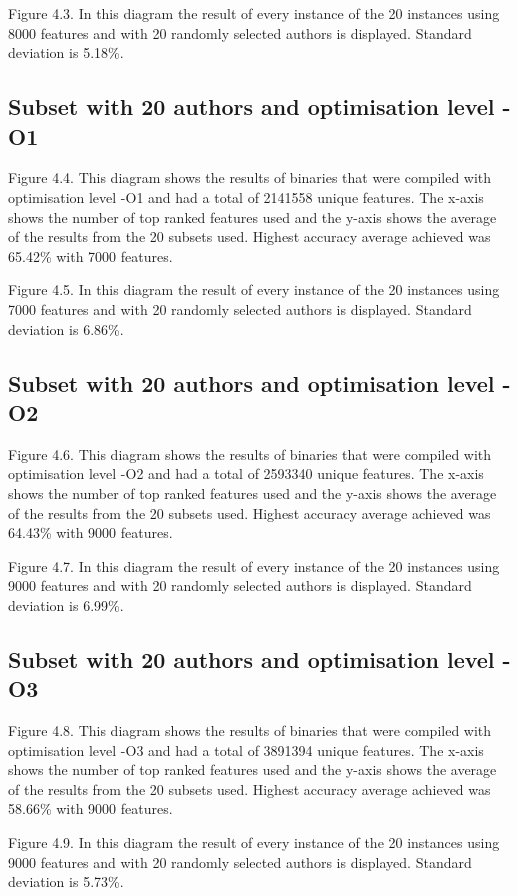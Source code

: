 \documentclass[a4paper,11pt]{kth-mag}
\begin{document}
Figure 4.3. In this diagram the result of every instance of the 20 instances
using 8000 features and with 20 randomly selected authors is displayed.
Standard deviation is 5.18\%. 

\subsection{Subset with 20 authors and optimisation level -O1}
Figure 4.4. This diagram shows the results of binaries that were compiled with
optimisation level -O1 and had a total of 2141558 unique features. The x-axis
shows the number of top ranked features used and the y-axis shows the average
of the results from the 20 subsets used. Highest accuracy average achieved was
65.42\% with 7000 features. 


Figure 4.5. In this diagram the result of every instance of the 20 instances
using 7000 features and with 20 randomly selected authors is displayed.
Standard deviation is 6.86\%.

\subsection{Subset with 20 authors and optimisation level -O2}
Figure 4.6. This diagram shows the results of binaries that were compiled with
optimisation level -O2 and had a total of 2593340 unique features. The x-axis
shows the number of top ranked features used and the y-axis shows the average
of the results from the 20 subsets used. Highest accuracy average achieved was
64.43\% with 9000 features.

Figure 4.7. In this diagram the result of every instance of the 20 instances
using 9000 features and with 20 randomly selected authors is displayed.
Standard deviation is 6.99\%.

\subsection{Subset with 20 authors and optimisation level -O3}
Figure 4.8. This diagram shows the results of binaries that were compiled with
optimisation level -O3 and had a total of 3891394 unique features. The x-axis
shows the number of top ranked features used and the y-axis shows the average
of the results from the 20 subsets used. Highest accuracy average achieved was
58.66\% with 9000 features.

Figure 4.9. In this diagram the result of every instance of the 20 instances
using 9000 features and with 20 randomly selected authors is displayed.
Standard deviation is 5.73\%.
\end{document}
